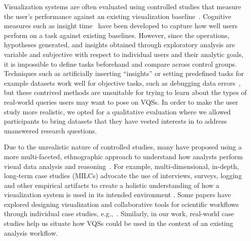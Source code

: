 \par Visualization systems are often evaluated using controlled studies that measure the user's performance against an existing visualization baseline~\cite{Plaisant2004}. Cognitive measures such as insight time~\cite{North2006,Yi2008} have been developed to capture how well users perform on a task against existing baselines. However, since the operations, hypotheses generated, and insights obtained through exploratory analysis are variable and subjective with respect to individual users and their analytic goals, it is impossible to define tasks beforehand and compare across control groups. Techniques such as artificially inserting ``insights'' or setting predefined tasks for example datasets work well for objective tasks, such as debugging data errors~\cite{kandel2011wrangler,Patel2010}, but these contrived methods are unsuitable for trying to learn about the types of real-world queries users may want to pose on VQSs. In order to make the user study more realistic, we opted for a qualitative evaluation where we allowed participants to bring datasets that they have vested interests in to address unanswered research questions.
\par Due to the unrealistic nature of controlled studies, many have proposed using a more multi-faceted, ethnographic approach to understand how analysts perform visual data analysis and reasoning~\cite{Plaisant2004,lam2012empirical,shneiderman2006strategies,munzner2009nested,Sedlmair2012}. For example, multi-dimensional, in-depth, long-term case studies (MILCs) advocate the use of interviews, surveys, logging and other empirical artifacts to create a holistic understanding of how a visualization system is used in its intended environment \cite{shneiderman2006strategies}. Some papers have explored designing visualization and collaborative tools for scientific workflows through individual case studies, e.g.,~\cite{Poon2008,Chen2016}. Similarly, in our work, real-world case studies help us situate how VQSs could be used in the context of an existing analysis workflow.  
